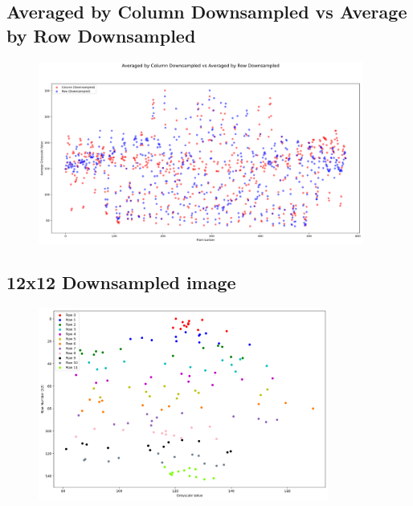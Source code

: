 \documentclass[11pt]{article}
\begin{document}
\begin{appendices}
\newpage
\subsection{Averaged by Column Downsampled vs Average by Row Downsampled}\label{AvColDSvAvRowDS}
\begin{figure}[h!]
  \centering
  \includegraphics[width=0.95\textwidth]{Images/AvColDS vs AvRowDS.png}
\end{figure}

\subsection{12x12 Downsampled image}\label{12x12Scatter} 
\begin{figure}[h!]
  \includegraphics[width=0.85\textwidth]{Images/12x12 Scatter.png}
\end{figure}

\newpage

\end{appendices}
\end{document}
